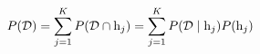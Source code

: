 \begin{equation}
    P( \mathcal{D} ) = \sum_{j=1}^K P( \mathcal{D} \cap \mathrm{h}_{j} ) = \sum_{j=1}^K P( \mathcal{D} \mid \mathrm{h}_{j} ) P( \mathrm{h}_{j} )
\label{eq:law_of_total_prob}
\end{equation}


